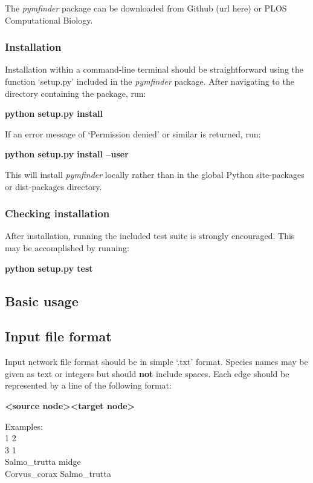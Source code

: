 \documentclass[12pt]{article}
\begin{document}
			The \emph{pymfinder} package can be downloaded from Github (url here) or PLOS Computational Biology.

		\subsubsection{Installation}

			Installation within a command-line terminal should be straightforward using the function `setup.py' included in the \emph{pymfinder} package. After navigating to the directory containing the package, run:

			\textbf{python setup.py install}

			If an error message of `Permission denied' or similar is returned, run:

			\textbf{python setup.py install --user}

			This will install \emph{pymfinder} locally rather than in the global Python site-packages or dist-packages directory. 


		\subsubsection{Checking installation}

			After installation, running the included test suite is strongly encouraged. This may be accomplished by running:

			\textbf{python setup.py test}


	\subsection{Basic usage}


		\subsection{Input file format}

			Input network file format should be in simple `.txt' format. Species names may be given as text or integers but should \textbf{not} include spaces. Each edge should be represented by a line of the following format:

			\textbf{\textless source node\textgreater  \textless target node\textgreater}

			Examples:\\
			1 2\\
			3 1\\
			Salmo\_trutta midge\\
			Corvus\_corax Salmo\_trutta\\
\end{document}
